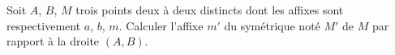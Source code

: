Soit $A$, $B$, $M$ trois points deux à deux distincts dont les affixes sont respectivement $a$, $b$, $m$. Calculer l'affixe $m'$ du symétrique noté $M'$ de $M$ par rapport à la droite $(A,B)$.